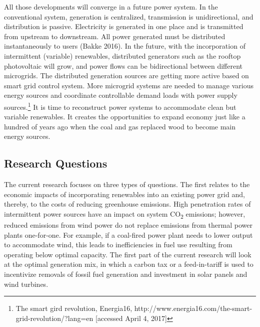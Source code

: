All those developments will converge in a future power system. In the
conventional system, generation is centralized, transmission is
unidirectional, and distribution is passive. Electricity is generated in
one place and is transmitted from upstream to downstream. All power
generated must be distributed instantaneously to users (Bakke 2016). In
the future, with the incorporation of intermittent (variable)
renewables, distributed generators such as the rooftop photovoltaic will
grow, and power flows can be bidirectional between different microgrids.
The distributed generation sources are getting more active based on
smart grid control system. More microgrid systems are needed to manage
various energy sources and coordinate controllable demand loads with
power supply sources.\footnote{The smart gird revolution, Energia16,
  http://www.energia16.com/the-smart-grid-revolution/?lang=en
  {[}accessed April 4, 2017{]}} It is time to reconstruct power systems
to accommodate clean but variable renewables. It creates the
opportunities to expand economy just like a hundred of years ago when
the coal and gas replaced wood to become main energy sources.

\subsection{Research Questions}\label{research-questions}

The current research focuses on three types of questions. The first
relates to the economic impacts of incorporating renewables into an
existing power grid and, thereby, to the costs of reducing greenhouse
emissions. High penetration rates of intermittent power sources have an
impact on system CO\textsubscript{2} emissions; however, reduced
emissions from wind power do not replace emissions from thermal power
plants one-for-one. For example, if a coal-fired power plant needs to
lower output to accommodate wind, this leads to inefficiencies in fuel
use resulting from operating below optimal capacity. The first part of
the current research will look at the optimal generation mix, in which a
carbon tax or a feed-in-tariff is used to incentivize removals of fossil
fuel generation and investment in solar panels and wind turbines.

